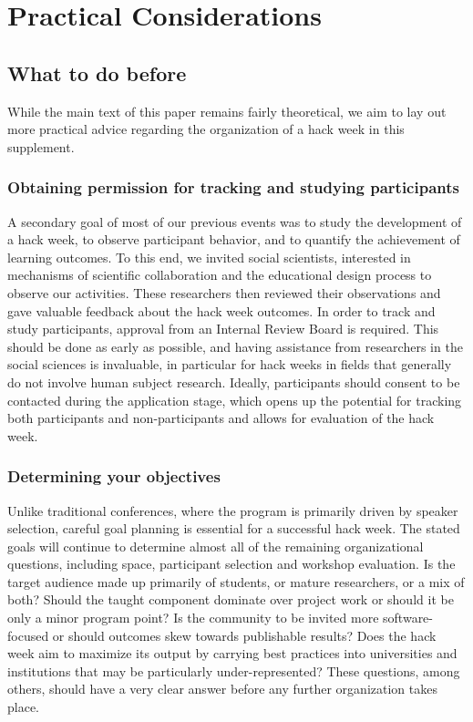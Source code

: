 \documentclass{aastex62}
\begin{document}
\clearpage

\section{Practical Considerations}
\subsection{What to do before}

\noindent While the main text of this paper remains fairly theoretical, we aim to lay out more practical advice regarding the organization of a hack week in this supplement.

\subsubsection{Obtaining permission for tracking and studying participants}
A secondary goal of most of our previous events was to study the development of a hack week, to observe participant behavior, and to quantify the achievement of learning outcomes. To this end, we invited social scientists, interested in mechanisms of scientific collaboration and the educational design process to observe our activities. These researchers then reviewed their observations and gave valuable feedback about the hack week outcomes. In order to track and study participants, approval from an Internal Review Board is required. This should be done as early as possible, and having assistance from researchers in the social sciences is invaluable, in particular for hack weeks in fields that generally do not involve human subject research. Ideally, participants should consent to be contacted during the application stage, which opens up the potential for tracking both participants and non-participants and allows for evaluation of the hack week.

\subsubsection{Determining your objectives}

Unlike traditional conferences, where the program is primarily driven by speaker selection, careful goal planning is essential for a successful hack week. The stated goals will continue to determine almost all of the remaining organizational questions, including space, participant selection and workshop evaluation. Is the target audience made up primarily of students, or mature researchers, or a mix of both? Should the taught component dominate over project work or should it be only a minor program point? Is the community to be invited more software-focused or should outcomes skew towards publishable results? Does the hack week aim to maximize its output by carrying best practices into universities and institutions that may be particularly under-represented? These questions, among others, should have a very clear answer before any further organization takes place.
\end{document}
